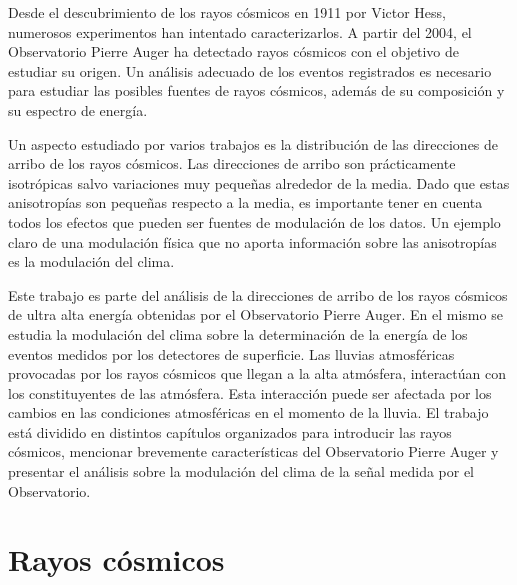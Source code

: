 


Desde el descubrimiento de los rayos cósmicos en 1911 por Victor Hess, numerosos experimentos han intentado caracterizarlos. A partir del 2004, el Observatorio Pierre Auger ha detectado rayos cósmicos con el objetivo de estudiar su origen. Un análisis adecuado de los eventos registrados es necesario para estudiar las posibles fuentes de rayos cósmicos, además de su composición y su espectro de energía.

Un aspecto estudiado por varios trabajos \cite{collaboration2013pierre} \cite{data} es la distribución  de las direcciones de arribo de los rayos cósmicos. Las direcciones de arribo son prácticamente isotrópicas salvo variaciones muy pequeñas alrededor de la media. Dado que estas  anisotropías son pequeñas respecto a la media, es importante tener en cuenta todos los efectos que pueden ser fuentes de modulación de los datos. Un ejemplo claro de una modulación física que no aporta información sobre las anisotropías es la modulación del clima.

Este trabajo es parte del análisis de la direcciones de arribo de los rayos cósmicos de ultra alta energía obtenidas por el Observatorio Pierre Auger. En el mismo se estudia la modulación del clima sobre la determinación de la energía de los eventos medidos por los detectores de superficie. Las lluvias atmosféricas provocadas por los rayos cósmicos que llegan a la alta atmósfera, interactúan con los constituyentes de las atmósfera. Esta interacción puede ser afectada por los cambios en las condiciones atmosféricas en el momento de la lluvia. El trabajo está dividido en distintos capítulos organizados para introducir las rayos cósmicos, mencionar brevemente características del Observatorio Pierre Auger y presentar el análisis sobre la modulación del clima de la señal medida por el Observatorio.

\section{Rayos cósmicos}


